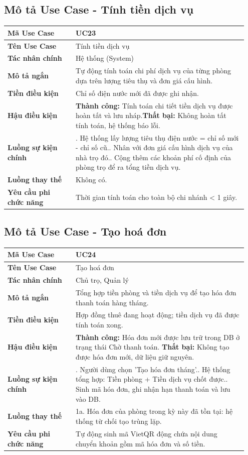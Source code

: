 \documentclass[a4paper,oneside]{report}
\begin{document}
\subsection{Mô tả Use Case - Tính tiền dịch vụ}

\begin{longtable}[]{@{}>{\RaggedRight\arraybackslash}p{0.27\linewidth}>{\RaggedRight\arraybackslash}p{0.68\linewidth}@{}}
\toprule
\textbf{Mã Use Case} & UC23\tabularnewline
\midrule
\endhead
\textbf{Tên Use Case} & Tính tiền dịch vụ\tabularnewline
\textbf{Tác nhân chính} & Hệ thống (System)\tabularnewline
\textbf{Mô tả ngắn} & Tự động tính toán chi phí dịch vụ của từng phòng
dựa trên lượng tiêu thụ và đơn giá cấu hình.\tabularnewline
\textbf{Tiền điều kiện} & Chỉ số điện nước mới đã được ghi
nhận.\tabularnewline
\textbf{Hậu điều kiện} & \textbf{Thành công:} Tính toán chi tiết tiền dịch vụ được hoàn tất và lưu nháp.\newline \textbf{Thất bại:} Không hoàn tất tính toán, hệ thống báo lỗi.\tabularnewline
\textbf{Luồng sự kiện chính} & 1. Hệ thống lấy lượng
tiêu thụ điện nước = chỉ số mới - chỉ số cũ.\newline 2. Nhân với
đơn giá cấu hình dịch vụ của nhà trọ đó.\newline 3. Cộng thêm các
khoản phí cố định của phòng trọ để ra tổng tiền dịch
vụ.\tabularnewline
\textbf{Luồng thay thế} & Không có.\tabularnewline
\textbf{Yêu cầu phi chức năng} & Thời gian tính toán cho toàn bộ chi
nhánh \textless{} 1 giây.\tabularnewline
\bottomrule
\end{longtable}

\subsection{Mô tả Use Case - Tạo hoá đơn}

\begin{longtable}[]{@{}>{\RaggedRight\arraybackslash}p{0.27\linewidth}>{\RaggedRight\arraybackslash}p{0.68\linewidth}@{}}
\toprule
\textbf{Mã Use Case} & UC24\tabularnewline
\midrule
\endhead
\textbf{Tên Use Case} & Tạo hoá đơn\tabularnewline
\textbf{Tác nhân chính} & Chủ trọ, Quản lý\tabularnewline
\textbf{Mô tả ngắn} & Tổng hợp tiền phòng và tiền dịch vụ để tạo hóa đơn
thanh toán hàng tháng.\tabularnewline
\textbf{Tiền điều kiện} & Hợp đồng thuê đang hoạt động; tiền dịch vụ đã
được tính toán xong.\tabularnewline
\textbf{Hậu điều kiện} & \textbf{Thành công:} Hóa đơn mới được lưu trữ trong DB ở trạng thái Chờ thanh toán.\newline 
\textbf{Thất bại:} Không tạo được hóa đơn mới, dữ liệu giữ nguyên.\tabularnewline
\textbf{Luồng sự kiện chính} & 1. Người dùng chọn
'Tạo hóa đơn tháng'.\newline 2. Hệ thống tổng hợp: Tiền phòng +
Tiền dịch vụ chốt được.\newline 3. Sinh mã hóa đơn, ghi nhận hạn
thanh toán và lưu vào DB.\tabularnewline
\textbf{Luồng thay thế} & 1a. Hóa đơn của phòng trong kỳ này đã tồn tại:
hệ thống từ chối tạo trùng lặp.\tabularnewline
\textbf{Yêu cầu phi chức năng} & Tự động sinh mã VietQR động chứa nội
dung chuyển khoản gồm mã hóa đơn và số tiền.\tabularnewline
\bottomrule
\end{longtable}
\end{document}
